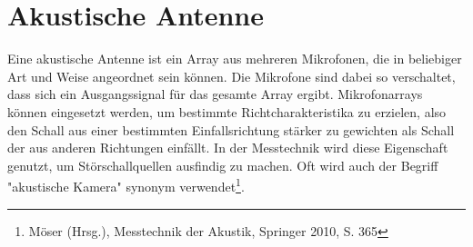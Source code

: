 \section{Akustische Antenne}
	Eine akustische Antenne ist ein Array aus mehreren Mikrofonen, die in beliebiger Art und Weise angeordnet sein können.
	Die Mikrofone sind dabei so verschaltet, dass sich ein Ausgangssignal für das gesamte Array ergibt.
	Mikrofonarrays können eingesetzt werden, um bestimmte Richtcharakteristika zu erzielen, also den Schall aus einer bestimmten Einfallsrichtung stärker zu gewichten als Schall der aus anderen Richtungen einfällt.
	In der Messtechnik wird diese Eigenschaft genutzt, um Störschallquellen ausfindig zu machen. %
	Oft wird auch der Begriff "akustische Kamera" synonym verwendet\footnote{Möser (Hrsg.), Messtechnik der Akustik, Springer 2010, S. 365}.